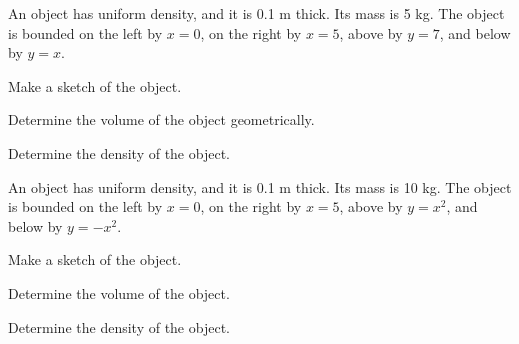 \begin{problem}
\item An object has uniform density, and it is 0.1 m thick. Its mass
  is 5 kg. The object is bounded on the left by $x=0$, on the right by
  $x=5$, above by $y=7$, and below by $y=x$.
  \begin{subproblem}
    \item Make a sketch of the object.
      \vfill
    \item Determine the volume of the object geometrically.
      \vfill
    \item Determine the density of the object.
      \vfill
  \end{subproblem}
  \clearpage

\item An object has uniform density, and it is 0.1 m thick. Its mass
  is 10 kg. The object is bounded on the left by $x=0$, on the right
  by $x=5$, above by $y=x^2$, and below by $y=-x^2$.
  \begin{subproblem}
    \item Make a sketch of the object. 
      \vfill
    \item Determine the volume of the object.
      \vfill
    \item Determine the density of the object.
      \vfill
  \end{subproblem}

\end{problem}

